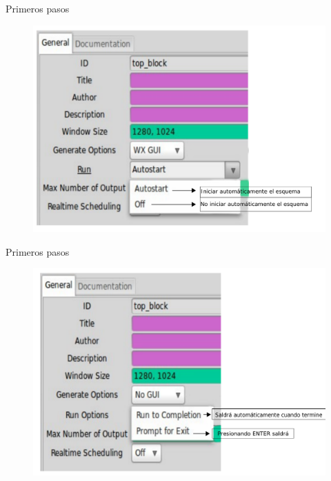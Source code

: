 \begin{frame}{Primeros pasos}
\begin{figure}[H]
\centering
\includegraphics[width=\textwidth, height=0.6\textwidth]{lab1/pdf/lab106.pdf}
\end{figure}
\end{frame}

\begin{frame}{Primeros pasos}
\begin{figure}[H]
\centering
\includegraphics[width=\textwidth, height=0.6\textwidth]{lab1/pdf/lab107.pdf}
\end{figure}
\end{frame}

